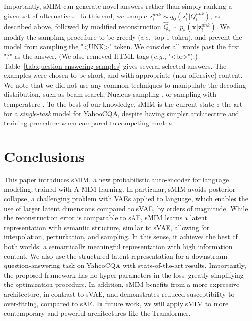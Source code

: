 \documentclass{article}
\newcommand{\bs}{\boldsymbol}
\newcommand{\eg}{{\em e.g.}}
\newcommand{\ie}{{\em i.e.}}
\newcommand{\x}{{\bs{x}}}
\newcommand{\z}{{\bs z}}
\newcommand{\params}{{\bs \theta}}
\newcommand{\pdec}{p}
\newcommand{\penc}{q}
\newcommand{\Mdec}{\pdec_{\params}}
\newcommand{\Menc}{\penc_{\params}}
\begin{document}
Importantly, sMIM can generate novel answers rather than simply ranking a given set of alternatives.
To this end, we sample $\z_i^{unk} \sim \Menc(\z_i^k|Q_i^{unk})$, as described above,
followed by modified reconstruction $\widehat{Q}_i \sim \Mdec(\x|\z_i^{unk})$. 
We modify the sampling procedure to be greedy (\ie, top 1 token), and prevent 
the model from sampling the "\textsc{<UNK>}" token.
We consider all words past the first "?" as the answer. (We also removed HTML tags (\eg, "<br>").)
Table\ \ref{tab:question-answering-samples} gives several selected answers.
The examples were chosen to be short, and with appropriate (non-offensive) content.
We note that we did not use any common techniques to manipulate the decoding distribution,
such as beam search, Nucleus sampling \citep{DBLP:journals/corr/abs-1904-09751}, or sampling with temperature \citep{ACKLEY1985147}.
To the best of our knowledge, sMIM is the current state-o-the-art for a {\em single-task} model for YahooCQA, 
despite having simpler architecture and training procedure when compared to competing models.

 \section{Conclusions}

This paper introduces sMIM, a new probabilistic auto-encoder for language modeling,
trained with A-MIM learning.  
In particular, sMIM avoids posterior collapse, a challenging problem with VAEs applied to language,
which enables the use of larger latent dimensions compared to sVAE, by orders of magnitude.
While the reconstruction error is comparable to sAE, sMIM learns a latent representation with semantic structure, similar to sVAE, 
allowing for interpolation, perturbation, and sampling. In this sense, it achieves the best of both worlds: a semantically meaningful representation with high information content.
We also use the structured latent representation for a downstream question-answering task on YahooCQA with state-of-the-art results.
Importantly, the proposed framework has no hyper-parameters in the loss, greatly simplifying the optimization procedure.
In addition, sMIM benefits from a more expressive architecture, in contrast to sVAE, and demonstrates reduced susceptibility to over-fitting, compared to sAE. 
In future work, we will apply sMIM to more contemporary and powerful architectures like the Transformer.
 
\end{document}
